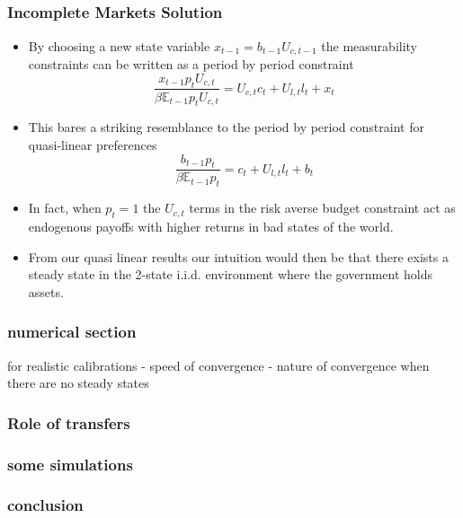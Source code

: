 \documentclass{beamer}
\newcommand{\EE}{\mathbb E}
\begin{document}
\subsection{}

 \begin{frame}
 	\frametitle{Incomplete Markets Solution}
	\begin{itemize}
	\item By choosing a new state variable $x_{t-1} = b_{t-1} U_{c,t-1}$ the measurability constraints can be written as a period by period constraint
	\[
		\frac{x_{t-1} p_t U_{c,t}}{\beta \EE_{t-1} p_t U_{c,t}}  = U_{c,t}c_t+U_{l,t} l_t + x_t
	\]
	\item  This bares a striking resemblance to the period by period constraint for quasi-linear preferences
	\[
		\frac{b_{t-1} p_t}{\beta \EE_{t-1} p_t} = c_t + U_{l,t} l_t + b_t
	\]
	\item  In fact, when $p_t =1$ the $U_{c,t}$ terms in the risk averse budget constraint act as endogenous payoffs with higher returns in bad states of the world.
	\item  From our quasi linear results our intuition would then be that there exists a steady state in the 2-state i.i.d. environment where the government holds assets.
	\end{itemize}
\end{frame}
  
 \begin{frame}
  \frametitle{numerical section}
   for realistic calibrations
  - speed of convergence
  - nature of convergence when there are no steady states
 \end{frame}
  
 
 \begin{frame}
  \frametitle{Role of transfers}
 \end{frame}
 
 \begin{frame}
  \frametitle{some simulations}
  \end{frame}
 
 \begin{frame}
  \frametitle{conclusion}
 \end{frame}

 
\end{document}
